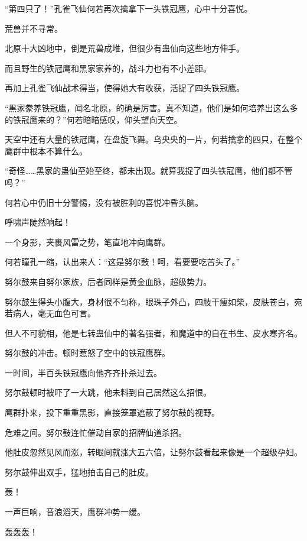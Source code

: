 
\begin{this_body}

“第四只了！”孔雀飞仙何若再次擒拿下一头铁冠鹰，心中十分喜悦。

荒兽并不寻常。

北原十大凶地中，倒是荒兽成堆，但很少有蛊仙向这些地方伸手。

而且野生的铁冠鹰和黑家家养的，战斗力也有不小差距。

再加上孔雀飞仙战术得当，使得她大有收获，活捉了四头铁冠鹰。

“黑家豢养铁冠鹰，闻名北原，的确是厉害。真不知道，他们是如何培养出这么多的铁冠鹰来的？”何若暗暗感叹，仰头望向天空。

天空中还有大量的铁冠鹰，在盘旋飞舞。乌央央的一片，何若擒拿的四只，在整个鹰群中根本不算什么。

“奇怪……黑家的蛊仙至始至终，都未出现。就算我捉了四头铁冠鹰，他们都不管吗？”

何若心中仍旧十分警惕，没有被胜利的喜悦冲昏头脑。

呼啸声陡然响起！

一个身影，夹裹风雷之势，笔直地冲向鹰群。

何若瞳孔一缩，认出来人：“这是努尔鼓！呵，看要要吃苦头了。”

努尔鼓来自努尔家族，后者同样是黄金血脉，超级势力。

努尔鼓生得头小腹大，身材很不匀称，眼珠子外凸，四肢干瘦如柴，皮肤苍白，宛若病人，毫无血色可言。

但人不可貌相，他是七转蛊仙中的著名强者，和魔道中的自在书生、皮水寒齐名。

努尔鼓的冲击。顿时惹怒了空中的铁冠鹰群。

一时间，半百头铁冠鹰向他齐齐扑杀过去。

努尔鼓顿时被吓了一大跳，他未料到自己居然这么招恨。

鹰群扑来，投下重重黑影，直接笼罩遮蔽了努尔鼓的视野。

危难之间。努尔鼓连忙催动自家的招牌仙道杀招。

他肚皮忽然见风而涨，转眼间就涨大五六倍，让努尔鼓看起来像是一个超级孕妇。

努尔鼓伸出双手，猛地拍击自己的肚皮。

轰！

一声巨响，音浪滔天，鹰群冲势一缓。

轰轰轰！


\end{this_body}
